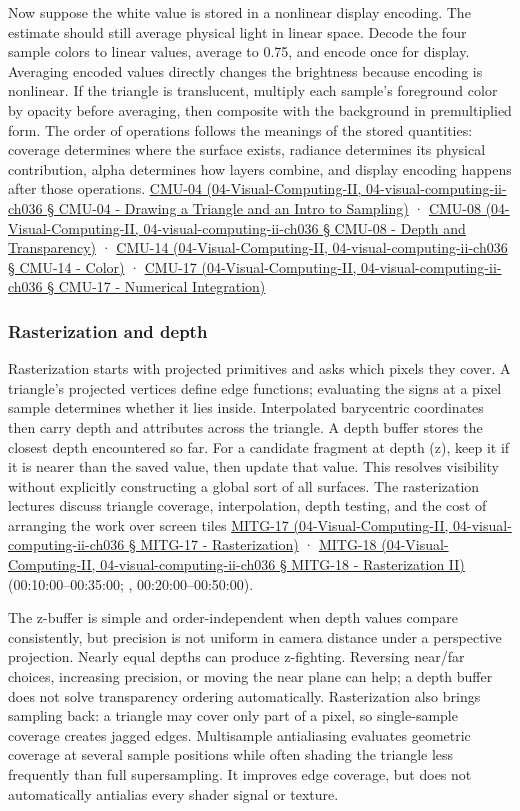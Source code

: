 Now suppose the white value is stored in a nonlinear display encoding. The estimate should still average physical light in linear space. Decode the four sample colors to linear values, average to 0.75, and encode once for display. Averaging encoded values directly changes the brightness because encoding is nonlinear. If the triangle is translucent, multiply each sample's foreground color by opacity before averaging, then composite with the background in premultiplied form. The order of operations follows the meanings of the stored quantities: coverage determines where the surface exists, radiance determines its physical contribution, alpha determines how layers combine, and display encoding happens after those operations. \href{}{CMU-04 (04-Visual-Computing-II, 04-visual-computing-ii-ch036 § CMU-04 - Drawing a Triangle and an Intro to Sampling)} · \href{}{CMU-08 (04-Visual-Computing-II, 04-visual-computing-ii-ch036 § CMU-08 - Depth and Transparency)} · \href{}{CMU-14 (04-Visual-Computing-II, 04-visual-computing-ii-ch036 § CMU-14 - Color)} · \href{}{CMU-17 (04-Visual-Computing-II, 04-visual-computing-ii-ch036 § CMU-17 - Numerical Integration)}

\subsubsection{Rasterization and depth}\label{rasterization-and-depth}

Rasterization starts with projected primitives and asks which pixels they cover. A triangle's projected vertices define edge functions; evaluating the signs at a pixel sample determines whether it lies inside. Interpolated barycentric coordinates then carry depth and attributes across the triangle. A depth buffer stores the closest depth encountered so far. For a candidate fragment at depth (z), keep it if it is nearer than the saved value, then update that value. This resolves visibility without explicitly constructing a global sort of all surfaces. The rasterization lectures discuss triangle coverage, interpolation, depth testing, and the cost of arranging the work over screen tiles \href{}{MITG-17 (04-Visual-Computing-II, 04-visual-computing-ii-ch036 § MITG-17 - Rasterization)} · \href{}{MITG-18 (04-Visual-Computing-II, 04-visual-computing-ii-ch036 § MITG-18 - Rasterization II)} (00:10:00--00:35:00; , 00:20:00--00:50:00).

The z-buffer is simple and order-independent when depth values compare consistently, but precision is not uniform in camera distance under a perspective projection. Nearly equal depths can produce z-fighting. Reversing near/far choices, increasing precision, or moving the near plane can help; a depth buffer does not solve transparency ordering automatically. Rasterization also brings sampling back: a triangle may cover only part of a pixel, so single-sample coverage creates jagged edges. Multisample antialiasing evaluates geometric coverage at several sample positions while often shading the triangle less frequently than full supersampling. It improves edge coverage, but does not automatically antialias every shader signal or texture.

